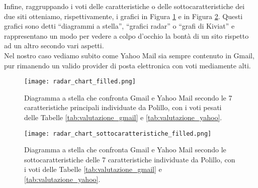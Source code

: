 		Infine, raggruppando i voti delle caratteristiche o delle sottocaratteristiche dei due siti otteniamo, rispettivamente, i grafici in Figura \ref{fig:radar_chart} e in Figura \ref{fig:radar_chart_sottocaratteristiche}. Questi grafici sono detti ``diagrammi a stella'', ``grafici radar'' o ``grafi di Kiviat'' e rappresentano un modo per vedere a colpo d'occhio la bontà di un sito rispetto ad un altro secondo vari aspetti.\\
		Nel nostro caso vediamo subito come Yahoo Mail sia sempre contenuto in Gmail, pur rimanendo un valido provider di posta elettronica con voti mediamente alti.
		\begin{figure}[h!]
			\begin{center}
				\texttt{[image: radar\_chart\_filled.png]}
			\end{center}
			\caption[Diagramma a stella]{Diagramma a stella che confronta Gmail e Yahoo Mail secondo le 7 caratteristiche principali individuate da Polillo, con i voti pesati delle Tabelle \ref{tab:valutazione_gmail} e \ref{tab:valutazione_yahoo}.}
			\label{fig:radar_chart}
		\end{figure}
		
		\begin{figure}[h!]
			\begin{center}
				\texttt{[image: radar\_chart\_sottocaratteristiche\_filled.png]}
			\end{center}
			\caption[Diagramma a stella (sottocaratteristiche)]{Diagramma a stella che confronta Gmail e Yahoo Mail secondo le sottocaratteristiche delle 7 caratteristiche individuate da  Polillo, con i voti delle Tabelle \ref{tab:valutazione_gmail} e \ref{tab:valutazione_yahoo}.}
			\label{fig:radar_chart_sottocaratteristiche}
		\end{figure}
